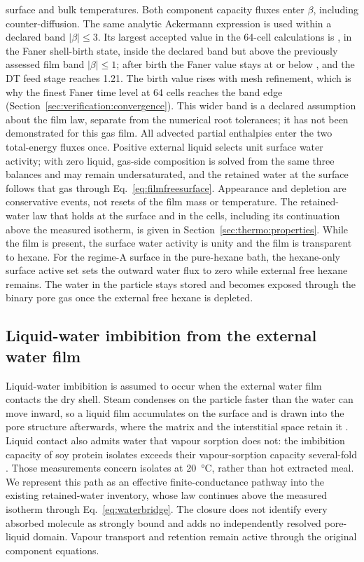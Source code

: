 surface and bulk temperatures. Both component capacity fluxes enter
$\beta$, including counter-diffusion. The same analytic Ackermann
expression is used within a declared band $|\beta|\le3$. Its largest
accepted value in the 64-cell calculations is \FanerMaxBeta, in the Faner
shell-birth state, inside the declared band but above the previously
assessed film band $|\beta|\le1$; after birth the Faner value stays at or
below \FanerMaxBetaAfterBirth, and the DT feed stage reaches 1.21. The
birth value rises with mesh refinement, which is why the finest Faner time
level at 64 cells reaches the band edge
(Section~\ref{sec:verification:convergence}). This wider band is a declared assumption
about the film law, separate from the numerical root tolerances; it has not
been demonstrated for this gas film.
All advected partial enthalpies enter the two total-energy fluxes once.
Positive external liquid selects unit surface water activity; with zero
liquid, gas-side composition is solved from the same three balances and
may remain undersaturated, and the retained water at the surface follows
that gas through Eq.~\eqref{eq:filmfreesurface}. Appearance and depletion
are conservative events, not resets of the film mass or temperature. The
retained-water law that holds at the surface and in the cells, including its
continuation above the measured isotherm, is given in
Section~\ref{sec:thermo:properties}. While the film is present, the surface
water activity is unity and the film is transparent to hexane.
For the regime-A surface in the pure-hexane bath, the hexane-only surface
active set sets the outward water flux to zero while external free hexane
remains. The water in the particle stays stored and becomes exposed through
the binary pore gas once the external free hexane is depleted.


\subsection{Liquid-water imbibition from the external water film}
\label{sec:model:liquidcontact}
Liquid-water imbibition is assumed to occur when the external water film
contacts the dry shell. Steam condenses on the particle faster than the
water can move inward, so a liquid film accumulates on the surface and is
drawn into the pore structure afterwards, where the matrix and the
interstitial space retain it \citep{karnofsky1985recovering}. Liquid
contact also admits water that vapour sorption does not: the imbibition
capacity of soy protein isolates exceeds their vapour-sorption capacity
several-fold \citep{jovanovich2003wateruptake}. Those measurements concern
isolates at \SI{20}{\celsius}, rather than hot extracted meal. We represent this path
as an effective finite-conductance pathway into the existing
retained-water inventory, whose law continues above the measured isotherm
through Eq.~\eqref{eq:waterbridge}. The closure does not identify
every absorbed molecule as strongly bound and adds no independently
resolved pore-liquid domain. Vapour transport and retention remain active
through the original component equations.

